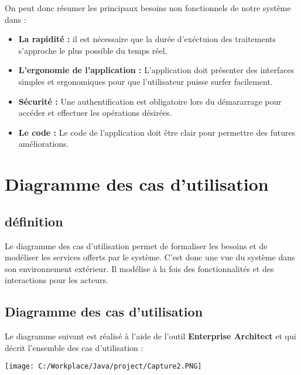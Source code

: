 \documentclass[12]{article}
\begin{document}
On peut donc résumer les principaux besoins non fonctionnels de notre système dans :\\

\begin{itemize}
\item \textbf{ La rapidité :} il est nécessaire que la durée d'exéctuion des traitements s'approche le plus possible du temps réel.
\item \textbf{ L'ergonomie de l'application :} L'application doit présenter des interfaces simples et ergonomiques pour que l'utilisateur puisse surfer facilement.

\item \textbf{ Sécurité :} Une authentification est obligatoire lors du démararrage pour accéder et effectuer les opérations désirées.

\item \textbf{ Le code :} Le code de l'application doit être clair pour permettre des futures améliorations.

\end{itemize}
\section{Diagramme des cas d'utilisation}

\subsection{définition}

Le diagramme des cas d'utilisation permet de formaliser les besoins et de modéliser les services offerts par le système. C'est donc une vue du système dans son environnement extérieur. Il modélise à la fois des fonctionnalités et des interactions pour les acteurs.

\subsection{Diagramme des cas d'utilisation}

Le diagramme suivant est réalisé à l'aide de l'outil \textbf{Enterprise  Architect} et qui décrit l'ensemble des cas d'utilisation :


\begin{center}
\texttt{[image: C:/Workplace/Java/project/Capture2.PNG]}
\end{center}
\newpage
\end{document}
